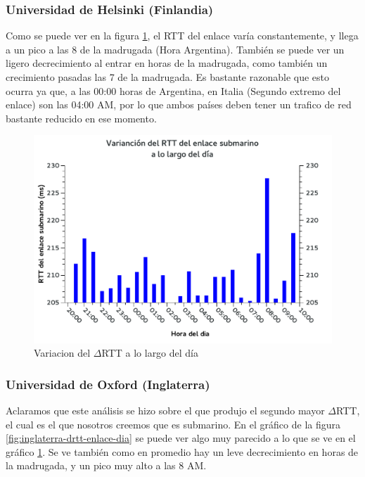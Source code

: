\subsubsection{Universidad de Helsinki (Finlandia)}

Como se puede ver en la figura \ref{fig:finlandia-drtt-enlace-dia}, el RTT del enlace varía constantemente, y llega a un pico a las 8 de la madrugada (Hora Argentina). También se puede ver un ligero decrecimiento al entrar en horas de la madrugada, como también un crecimiento pasadas las 7 de la madrugada. Es bastante razonable que esto ocurra ya que, a las 00:00 horas de Argentina, en Italia (Segundo extremo del enlace) son las 04:00 AM, por lo que ambos países deben tener un trafico de red bastante reducido en ese momento.

\begin{figure}[H]
  \begin{center}
    \includegraphics[scale=0.8]{graficos/finlandia-drtt-enlace-dia.pdf}
	\caption{Variacion del  $\Delta$RTT a lo largo del día}
    \label{fig:finlandia-drtt-enlace-dia}  
  \end{center}
\end{figure}

\subsubsection{Universidad de Oxford (Inglaterra)}

Aclaramos que este análisis se hizo sobre el que produjo el segundo mayor $\Delta$RTT, el cual es el que nosotros creemos que es submarino. En el gráfico de la figura \ref{fig:inglaterra-drtt-enlace-dia} se puede ver algo muy parecido a lo que se ve en el gráfico \ref{fig:finlandia-drtt-enlace-dia}. Se ve también como en promedio hay un leve decrecimiento en horas de la madrugada, y un pico muy alto a las 8 AM.

